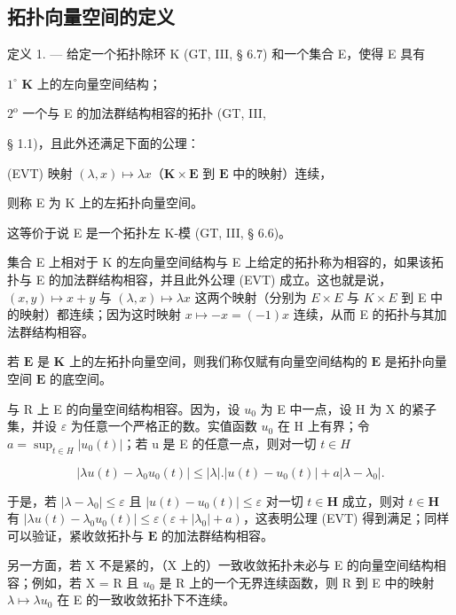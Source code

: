 \subsection{拓扑向量空间的定义}

定义 1. --- 给定一个拓扑除环 K (GT, III, § 6.7) 和一个集合 E，使得 E 具有

\(1^{\circ}\) \(\mathbf{K}\) 上的左向量空间结构；

\(2^{\mathrm{o}}\) 一个与 E 的加法群结构相容的拓扑 (GT, III,

§ 1.1)，且此外还满足下面的公理：

(EVT) 映射 \((\lambda, x) \mapsto \lambda x\)（\(\mathbf{K} \times \mathbf{E}\) 到 \(\mathbf{E}\) 中的映射）连续，

则称 E 为 K 上的左拓扑向量空间。

这等价于说 E 是一个拓扑左 K-模 (GT, III, § 6.6)。

集合 E 上相对于 K 的左向量空间结构与 E 上给定的拓扑称为相容的，如果该拓扑与 E 的加法群结构相容，并且此外公理 (EVT) 成立。这也就是说，\((x, y) \mapsto x + y\) 与 \((\lambda, x) \mapsto \lambda x\) 这两个映射（分别为 \(E \times E\) 与 \(K \times E\) 到 E 中的映射）都连续；因为这时映射 \(x \mapsto -x = (-1)x\) 连续，从而 E 的拓扑与其加法群结构相容。

若 \(\mathbf{E}\) 是 \(\mathbf{K}\) 上的左拓扑向量空间，则我们称仅赋有向量空间结构的 \(\mathbf{E}\) 是拓扑向量空间 \(\mathbf{E}\) 的底空间。

与 R 上 E 的向量空间结构相容。因为，设 \(u_{0}\) 为 E 中一点，设 H 为 X 的紧子集，并设 \(\varepsilon\) 为任意一个严格正的数。实值函数 \(u_{0}\) 在 H 上有界；令 \(a = \sup_{t \in H} |u_{0}(t)|\)；若 u 是 E 的任意一点，则对一切 \(t \in H\)

\[
\left| \lambda u (t) - \lambda_ {0} u _ {0} (t) \right| \leqslant | \lambda |. \left| u (t) - u _ {0} (t) \right| + a \left| \lambda - \lambda_ {0} \right|.
\]

于是，若 \(|\lambda - \lambda_0| \leqslant \varepsilon\) 且 \(|u(t) - u_0(t)| \leqslant \varepsilon\) 对一切 \(t \in \mathbf{H}\) 成立，则对 \(t \in \mathbf{H}\) 有 \(|\lambda u(t) - \lambda_0 u_0(t)| \leqslant \varepsilon (\varepsilon + |\lambda_0| + a)\)，这表明公理 (EVT) 得到满足；同样可以验证，紧收敛拓扑与 \(\mathbf{E}\) 的加法群结构相容。

另一方面，若 X 不是紧的，（X 上的）一致收敛拓扑未必与 E 的向量空间结构相容；例如，若 X = R 且 \(u_{0}\) 是 R 上的一个无界连续函数，则 R 到 E 中的映射 \(\lambda \mapsto \lambda u_{0}\) 在 E 的一致收敛拓扑下不连续。

